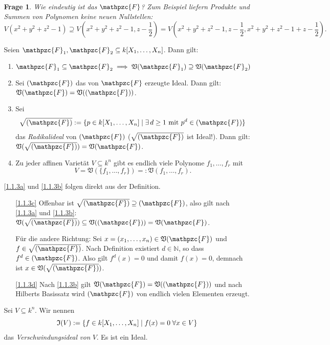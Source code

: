 \documentclass[a4paper,12pt]{scrbook}
\makeatletter
\theoremstyle{blah}
\newtheorem*{q}{Frage}
\theoremstyle{stz}
\renewcommand{\proofname}{Beweis}
\renewenvironment{proof}[1][\proofname]{\par
  \pushQED{\qed}%
  \normalfont \topsep6\p@\@plus6\p@\relax
  \trivlist
  \item[\hskip\labelsep
        \itshape
    #1\@addpunct{:}]\ignorespaces
}{%
  \popQED\endtrivlist\@endpefalse
}
\def\V{\mathfrak{V}}
\def\I{\mathfrak{I}}
\newcommand{\F}{\mathpzc{F}}
\newcommand{\set}[1]{\ensuremath{\mathbb{#1}}}
\newcommand{\N}{\set{N}}
\newcommand{\polyx}[1][n]{\ensuremath%
  [X_{1},\dotsc,X_{#1}]}
\makeatother
\begin{document}
\begin{q}Wie eindeutig ist das $\F$? Zum Beispiel liefern Produkte und Summen von Polynomen keine neuen Nullstellen:
\[V(x^{2}+y^{2}+z^{2}-1) \supseteq V(x^{2}+y^{2}+z^{2}-1, z-\frac{1}{2}) = V(x^{2}+y^{2}+z^{2}-1, z-\frac{1}{2}, x^{2}+y^{2}+z^{2}-1 + z-\frac{1}{2}).\]
\end{q}

\begin{bem}\label{1.1.3} Seien $\F_{1},\F_{2}\subseteq k\polyx$. Dann gilt:
\begin{enumerate}
\item\label{1.1.3a} $\F_{1}\subseteq\F_{2}\implies \V(\F_{1})\supseteq \V(\F_{2})$
\item\label{1.1.3b} Sei $(\F)$ das von $\F$ erzeugte Ideal. Dann gilt: $\V(\F) = \V((\F))$.
\item\label{1.1.3c} Sei
\[\sqrt{(\F)}:=\{p\in k\polyx\mid\exists\, d\geq 1\text{ mit }p^{d}\in(\F)\}\]
das \emph{Radikalideal} von $(\F)$ ($\sqrt{(\F)}$ ist Ideal!). Dann gilt: $\V(\sqrt{(\F)})=\V(\F)$.
\item\label{1.1.3d} Zu jeder affinen Varietät $V\subseteq k^{n}$ gibt es endlich viele Polynome $f_{1},\dotsc,f_{r}$ mit \[V=\V(\{f_{1},\dotsc,f_{r}\})=:\V(f_{1},\dotsc,f_{r}).\]
\end{enumerate}
\end{bem}

\begin{proof}
\ref{1.1.3a} und \ref{1.1.3b} folgen direkt aus der Definition.
\begin{enumerate}%
\item[\ref{1.1.3c}] Offenbar ist $\sqrt{(\F)}\supseteq(\F)$, also gilt nach \ref{1.1.3a} und \ref{1.1.3b}: $\V(\sqrt{(\F)})\subseteq \V((\F))=\V(\F)$.

Für die andere Richtung: Sei $x=(x_{1},\dotsc,x_{n})\in \V(\F)$ und $f\in\sqrt{(\F)}$. Nach Definition existiert $d\in\N$, so dass $f^{d}\in(\F)$. Also gilt $f^{d}(x)=0$ und damit $f(x)=0$, demnach ist $x\in \V(\sqrt{(\F)})$.
\item[\ref{1.1.3d}] Nach \ref{1.1.3b} gilt $\V(\F)=\V((\F))$ und nach Hilberts Basissatz wird $(\F)$ von endlich vielen Elementen erzeugt.
\end{enumerate}
\end{proof}

\begin{db}
Sei $V\subseteq k^{n}$. Wir nennen
\[\I(V):=\{f\in k\polyx\mid f(x)=0\;\forall x\in V\}\]
das \emph{Verschwindungsideal von $V$}. Es ist ein Ideal.
\end{db}
\end{document}
